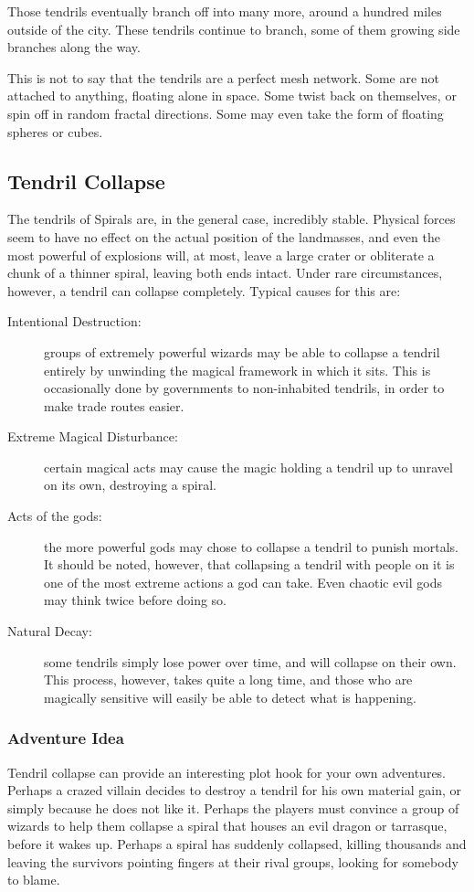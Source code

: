 \begin{multicols*}{2}
Those tendrils eventually branch off into many more, around a hundred miles outside of the city.  These tendrils continue to branch, some of them growing side branches along the way.

This is not to say that the tendrils are a perfect mesh network.
Some are not attached to anything, floating alone in space.
Some twist back on themselves, or spin off in random fractal directions.
Some may even take the form of floating spheres or cubes.


\subsection*{Tendril Collapse}
The tendrils of Spirals are, in the general case, incredibly stable.
Physical forces seem to have no effect on the actual position of the landmasses, and even the most powerful of explosions will, at most, leave a large crater or obliterate a chunk of a thinner spiral, leaving both ends intact.
Under rare circumstances, however, a tendril can collapse completely.
Typical causes for this are:
\begin{description}
\item[Intentional Destruction:] groups of extremely powerful wizards may be able to collapse a tendril entirely by unwinding the magical framework in which it sits. This is occasionally done by governments to non-inhabited tendrils, in order to make trade routes easier.
\item[Extreme Magical Disturbance:] certain magical acts may cause the magic holding a tendril up to unravel on its own, destroying a spiral.
\item[Acts of the gods:] the more powerful gods may chose to collapse a tendril to punish mortals. It should be noted, however, that collapsing a tendril with people on it is one of the most extreme actions a god can take. Even chaotic evil gods may think twice before doing so.
\item[Natural Decay:] some tendrils simply lose power over time, and will collapse on their own. This process, however, takes quite a long time, and those who are magically sensitive will easily be able to detect what is happening. 
\end{description}

\subsubsection{Adventure Idea}
Tendril collapse can provide an interesting plot hook for your own adventures.
Perhaps a crazed villain decides to destroy a tendril for his own material gain, or simply because he does not like it.
Perhaps the players must convince a group of wizards to help them collapse a spiral that houses an evil dragon or tarrasque, before it wakes up.
Perhaps a spiral has suddenly collapsed, killing thousands and leaving the survivors pointing fingers at their rival groups, looking for somebody to blame.



\end{multicols*}

